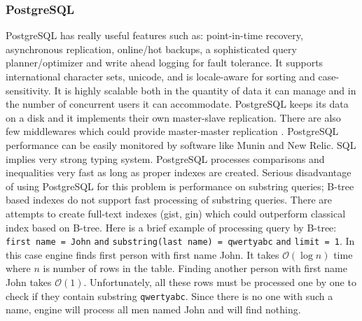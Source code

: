 \documentclass[10pt,a4paper]{article}
\newcommand{\Oh}{\mathcal{O}}
\begin{document}
\subsubsection{PostgreSQL}
PostgreSQL has really useful features such as: point-in-time recovery, asynchronous replication, online/hot backups, a sophisticated query planner/optimizer and write ahead logging for fault tolerance. It supports international character sets, unicode, and is locale-aware for sorting and case-sensitivity. It is highly scalable both in the quantity of data it can manage and in the number of concurrent users it can accommodate. PostgreSQL keeps its data on a disk and it implements their own master-slave replication. There are also few middlewares which could provide master-master replication \cite{PSQLREPL}. PostgreSQL performance can be easily monitored by software like Munin and New Relic. SQL implies very strong typing system. PostgreSQL processes comparisons and inequalities very fast as long as proper indexes are created. Serious disadvantage of using PostgreSQL for this problem is performance on substring queries; B-tree based indexes do not support fast processing of substring queries. There are attempts to create full-text indexes (gist, gin) which could outperform classical index based on B-tree.
Here is a brief example of processing query by B-tree: \verb|first name = John| \verb|and| \verb|substring(last name) = qwertyabc| \verb|and| \verb|limit = 1|. In this case engine finds first person with first name John. It takes $\Oh(\log n)$ time where $n$ is number of rows in the table. Finding another person with first name John takes $\Oh(1)$. Unfortunately, all these rows must be processed one by one to check if they contain substring \verb|qwertyabc|. Since there is no one with such a name, engine will process all men named John and will find nothing.
\end{document}
